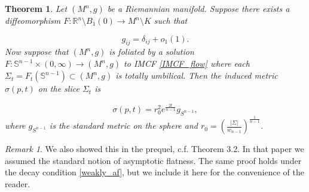 \documentclass[12pt,twoside]{article}
\theoremstyle{plain}
\newtheorem{theorem}{Theorem}[section]
\theoremstyle{definition}
\theoremstyle{remark}
\newtheorem*{remark}{Remark}
\numberwithin{equation}{section}
\begin{document}
\begin{theorem}
Let $(M^{n},g)$ be a Riemannian manifold. Suppose there exists a diffeomorphism $F: \mathbb{R}^{n} \setminus B_{1}(0) \rightarrow M^{n} \setminus K$ such that

\begin{equation} \label{weakly_af}
g_{ij}=\delta_{ij} + o_{1}(1).
\end{equation}
Now suppose that $(M^{n},g)$ is foliated by a solution $F: \mathbb{S}^{n-1} \times (0,\infty) \rightarrow (M^{n},g)$ to IMCF \eqref{IMCF_flow} where each $\Sigma_{t}= F_{t}(\mathbb{S}^{n-1}) \subset (M^{n},g)$ is totally umbilical. Then the induced metric $\sigma(p,t)$ on the slice $\Sigma_{t}$ is

\begin{equation}
    \sigma(p,t)= r_{0}^{2} e^{\frac{2t}{n-1}} g_{S^{n-1}},
\end{equation}
where $g_{S^{n-1}}$ is the standard metric on the sphere and $r_{0} = \left( \frac{|\Sigma|}{w_{n-1}} \right)^{\frac{1}{n-1}}$.
\end{theorem}
\begin{remark}
We also showed this in the prequel, c.f. \cite{HW} Theorem 3.2. In that paper we assumed the standard notion of asymptotic flatness. The same proof holds under the decay condition \eqref{weakly_af}, but we include it here for the convenience of the reader.
\end{remark}
\end{document}
